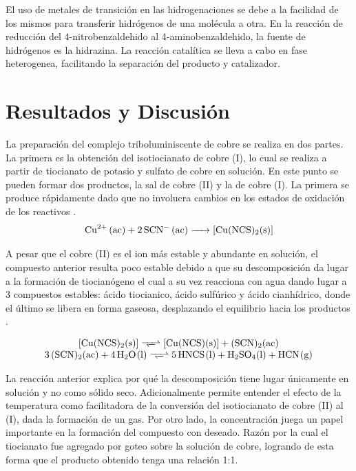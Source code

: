 \documentclass[fleqn,10pt]{SelfArx}
\begin{document}
El uso de metales de transici\'on en las hidrogenaciones se debe a la facilidad de los mismos para transferir hidr\'ogenos de una mol\'ecula a otra. En la reacci\'on de reducci\'on del 4-nitrobenzaldehido al 4-aminobenzaldehido, la fuente de hidr\'ogenos es la hidrazina. La reacci\'on catal\'itica se lleva a cabo en fase heterogenea, facilitando la separaci\'on del producto y catalizador.

\section{Resultados y Discusi\'on}
La preparaci\'on del complejo triboluminiscente de cobre se realiza en dos partes. La primera es la obtenci\'on del isotiocianato de cobre (I), lo cual se realiza a partir de tiocianato de potasio y sulfato de cobre en soluci\'on. En este punto se pueden formar dos productos, la sal de cobre (II) y la de cobre (I). La primera se produce r\'apidamente dado que no involucra cambios en los estados de oxidaci\'on de los reactivos \cite{tykodi_1991}\cite{tudela_1993}.
\begin{equation}
	\ce{Cu^{2+} (ac) + 2SCN- (ac) -> [Cu(NCS)2(s)]}
\end{equation}

A pesar que el cobre (II) es el ion m\'as estable y abundante en soluci\'on, el compuesto anterior resulta poco estable debido a que su descomposici\'on da lugar a la formaci\'on de tiocian\'ogeno  el cual a su vez reacciona con agua dando lugar a 3 compuestos estables: \'acido tiocianico, \'acido sulf\'urico y \'acido cianh\'idrico, donde el \'ultimo se libera en forma gaseosa, desplazando el equilibrio hacia los productos \cite{tudela_1993}.

\footnotesize
\begin{equation}
	\begin{array}{c}
		\ce{[Cu(NCS)2(s)] <=>> [Cu(NCS)(s)] + (SCN)2(ac)}\\
		\ce{3(SCN)2(ac) + 4H2O(l) <=>> 5HNCS(l) + H2SO4(l) + HCN(g)}
	\end{array}
\end{equation}
\normalsize

La reacci\'on anterior explica por qu\'e la descomposici\'on tiene lugar \'unicamente en soluci\'on y no como s\'olido seco. Adicionalmente permite entender el efecto de la temperatura como facilitadora de la conversi\'on del isotiocianato de cobre (II) al (I), dada la formaci\'on de un gas. Por otro lado, la concentraci\'on juega un papel importante en la formaci\'on del compuesto con deseado. Raz\'on por la cual el tiocianato fue agregado por goteo sobre la soluci\'on de cobre, logrando de esta forma que el producto obtenido tenga una relaci\'on 1:1.
\end{document}
